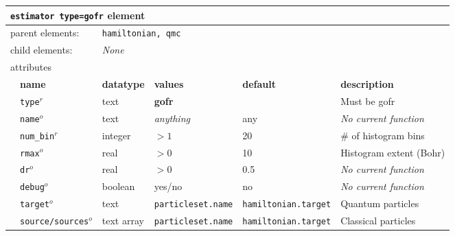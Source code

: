 \FloatBarrier
\begin{table}[h]
\begin{center}
\begin{tabularx}{\linewidth}{l l l l l X }
\hline
\multicolumn{6}{l}{\texttt{estimator type=gofr} element} \\
\hline
\multicolumn{2}{l}{parent elements:} & \multicolumn{4}{l}{\texttt{hamiltonian, qmc}}\\
\multicolumn{2}{l}{child  elements:} & \multicolumn{4}{l}{\textit{None}}\\
\multicolumn{2}{l}{attributes}  & \multicolumn{4}{l}{}\\
   & \bfseries name       & \bfseries datatype & \bfseries values  & \bfseries default   & \bfseries description \\
   & \texttt{type}$^r$    &  text              & \textbf{gofr}     &                     & Must be gofr       \\
   & \texttt{name}$^o$    &  text              & \textit{anything} & any                 & \textit{No current function} \\
   & \texttt{num\_bin}$^r$&  integer           & $>1$              & 20                  & \# of histogram bins \\
   & \texttt{rmax}$^o$    &  real              & $>0$              & 10                  & Histogram extent (Bohr) \\
   & \texttt{dr}$^o$      &  real              & $>0$              & 0.5                 & \textit{No current function} \\%
   & \texttt{debug}$^o$   &  boolean           & yes/no            & no                  & \textit{No current function} \\
   & \texttt{target}$^o$  &  text              &\texttt{particleset.name}&\texttt{hamiltonian.target}& Quantum particles \\   
   & \texttt{source/sources}$^o$&  text array  &\texttt{particleset.name}&\texttt{hamiltonian.target}& Classical particles\\
  \hline
\end{tabularx}
\end{center}
\end{table}
\FloatBarrier

